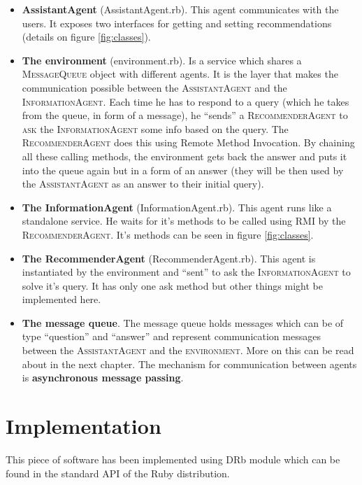 \documentclass[11pt,a4paper]{article} %
\begin{document}
\begin{itemize}
    \item \textbf{AssistantAgent} (AssistantAgent.rb). This agent communicates with the users. It exposes two interfaces for getting and setting recommendations (details on figure \ref{fig:classes}). 
    
    \item \textbf{The environment} (environment.rb). Is a service which shares a \textsc{MessageQueue} object with different agents. It is the layer that makes the communication possible between the \textsc{AssistantAgent} and the \textsc{InformationAgent}. Each time he has to respond to a query (which he takes from the queue, in form of a message), he ``sends'' a \textsc{RecommenderAgent} to \textsc{ask} the \textsc{InformationAgent} some info based on the query. The \textsc{RecommenderAgent} does this using Remote Method Invocation. By chaining all these calling methods, the environment gets back the answer and puts it into the queue again but in a form of an answer (they will be then used by the \textsc{AssistantAgent} as an answer to their initial query).
    
    \item \textbf{The InformationAgent} (InformationAgent.rb). This agent runs like a standalone service. He waits for it's methods to be called using RMI by the \textsc{RecommenderAgent}. It's methods can be seen in figure \ref{fig:classes}.
    
    \item \textbf{The RecommenderAgent} (RecommenderAgent.rb). This agent is instantiated by the environment and ``sent'' to ask the \textsc{InformationAgent} to solve it's query. It has only one ask method but other things might be implemented here.
    
    \item \textbf{The message queue}. The message queue holds messages which can be of type ``question'' and ``answer'' and represent communication messages between the \textsc{AssistantAgent} and the \textsc{environment}. More on this can be read about in the next chapter. The mechanism for communication between agents is \textbf{asynchronous message passing}.
\end{itemize}


\section{Implementation}
This piece of software has been implemented using DRb module which can be found in the standard API of the Ruby distribution. 
\end{document}
